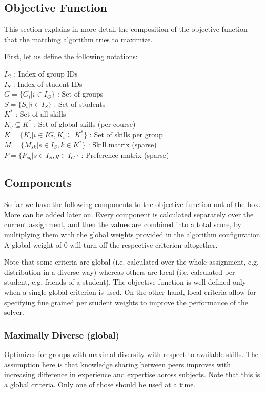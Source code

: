 \subsection{Objective Function}
This section explains in more detail the composition of the objective function that the matching algorithm tries to maximize.

First, let us define the following notations:

$I_G$ : Index of group IDs\\
$I_S$ : Index of student IDs\\
$G = \{ G_i | i \in I_G \}$ : Set of groups\\
$S = \{ S_i | i \in I_S \}$ : Set of students\\
$K^*$ : Set of all skills\\
$K_g \subseteq K^*$ : Set of global skills (per course)\\
$K = \{ K_i | i \in IG, K_i \subseteq K^* \}$ : Set of skills per group\\
$M = \{ M_{sk} | s \in I_S, k \in K^* \}$ : Skill matrix (sparse)\\
$P = \{ P_{sg} | s \in I_S, g \in I_G \}$ : Preference matrix (sparse)\\

\subsection{Components}
So far we have the following components to the objective function out of the box. More can be added later on. Every component is calculated separately over the current assignment, and then the values are combined into a total score, by multiplying them with the global weights provided in the algorithm configuration. A global weight of 0 will turn off the respective criterion altogether.

Note that some criteria are global (i.e. calculated over the whole assignment, e.g. distribution in a diverse way) whereas others are local (i.e. calculated per student, e.g. friends of a student). The objective function is well defined only when a single global criterion is used. On the other hand, local criteria allow for specifying fine grained per student weights to improve the performance of the solver.

\subsubsection{Maximally Diverse \small{(global)}}
Optimizes for groups with maximal diversity with respect to available skills. The assumption here is that knowledge sharing between peers improves with increasing difference in experience and expertise across subjects. Note that this is a global criteria. Only one of those should be used at a time.


